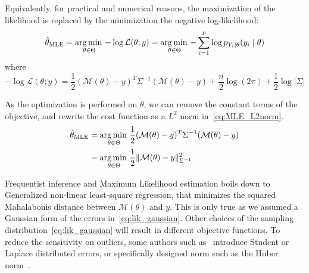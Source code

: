 \documentclass[../../Main_ManuscritThese.tex]{subfiles}
\begin{document}
  Equivalently, for practical and numerical reasons, the maximization of the likelihood is replaced by the minimization the negative log-likelihood:
  \begin{equation}
    \label{eq:MLE_iid}
    \hat{\theta}_{\mathrm{MLE}} = \operatorname*{arg\,min \,}_{\theta \in \Theta} -\log \mathcal{L}(\theta;y)= \operatorname*{arg\,min \,}_{\theta \in \Theta} -\sum_{i=1}^p\log p_{Y_i\mid \theta}(y_i \mid \theta) 
  \end{equation} 
  where
  \begin{equation}
    -\log\mathcal{L}(\theta;y) = \frac{1}{2}(\mathcal{M}(\theta) - y)^T\Sigma^{-1}(\mathcal{M}(\theta) - y)+  \frac{n}{2}\log(2\pi) + \frac{1}{2}\log\lvert \Sigma \rvert
  \end{equation}

As the optimization is performed on $\theta$, we can remove the constant terms of the objective, and rewrite the cost function as a $L^2$ norm in~\cref{eq:MLE_L2norm}.  %
  \begin{align}
    \hat{\theta}_{\mathrm{MLE}} &= \operatorname*{arg\,min \,}_{\theta \in \Theta}\frac{1}{2}(\mathcal{M}(\theta) - y)^T\Sigma^{-1}(\mathcal{M}(\theta) - y) \nonumber\\
                           &= \operatorname*{arg\,min \,}_{\theta \in \Theta}\frac12 \| \mathcal{M}(\theta) - y \|^2_{\Sigma^{-1}} \label{eq:MLE_L2norm}
  \end{align}

  Frequentist inference and Maximum Likelihood estimation boils down to Generalized non-linear least-square regression, that minimizes the squared Mahalabonis distance between $\mathcal{M}({\theta})$ and $y$. This is only true as we assumed a Gaussian form of the errors in~\cref{eq:lik_gaussian}. Other choices of the sampling distribution~\cref{eq:lik_gaussian} will result in different objective functions. To reduce the sensitivity on outliers, some authors such as~\cite{rao_robust_2015} introduce Student or Laplace distributed errors, or specifically designed norm such as the Huber norm~\cite{huber_robust_2011}.
\end{document}
